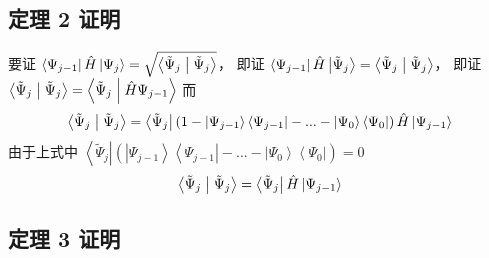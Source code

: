 \subsection{定理 2 证明}
要证 $\left\langle {{\Psi_{j - 1}}} \right|\hat H\left| {{\Psi_j}} \right\rangle  = \sqrt {\left\langle {{{{\tilde \Psi }_j}}}
 \mathrel{\left | {\vphantom {{{{\tilde \Psi }_j}} {{{\tilde \Psi }_j}}}}
 \right. \kern-\nulldelimiterspace}
 {{{{\tilde \Psi }_j}}} \right\rangle }$， 即证 $\left\langle {{\Psi_{j - 1}}} \right|\hat H\left| {{{\tilde \Psi }_j}} \right\rangle  = \left\langle {{{{\tilde \Psi }_j}}}
 \mathrel{\left | {\vphantom {{{{\tilde \Psi }_j}} {{{\tilde \Psi }_j}}}}
 \right. \kern-\nulldelimiterspace}
 {{{{\tilde \Psi }_j}}} \right\rangle$， 即证 $\left\langle {{{{\tilde \Psi }_j}}}
 \mathrel{\left | {\vphantom {{{{\tilde \Psi }_j}} {{{\tilde \Psi }_j}}}}
 \right. \kern-\nulldelimiterspace}
 {{{{\tilde \Psi }_j}}} \right\rangle  = \left\langle {{{{\tilde \Psi }_j}}}
 \mathrel{\left | {\vphantom {{{{\tilde \Psi }_j}} {\hat H{\Psi_{j - 1}}}}}
 \right. \kern-\nulldelimiterspace}
 {{\hat H{\Psi_{j - 1}}}} \right\rangle $
而
\begin{equation}
\left\langle {{\tilde \Psi }_j}
 \mathrel{\left | {\vphantom {{{\tilde \Psi }_j} {{\tilde \Psi }_j}}}
 \right. \kern-\nulldelimiterspace}
 {{\tilde \Psi }_j} \right\rangle  = \left\langle {{\tilde \Psi }_j} \right|\left( {1 - \left| {\Psi_{j - 1}} \right\rangle \left\langle {\Psi_{j - 1}} \right| - ... - \left| {\Psi_0} \right\rangle \left\langle {\Psi_0} \right|} \right)\hat H\left| {\Psi_{j - 1}} \right\rangle 
\end{equation}
由于上式中  $\left\langle {{{\tilde \Psi }_j}} \right|\left( {\left| {{\Psi_{j - 1}}} \right\rangle \left\langle {{\Psi_{j - 1}}} \right| - ... - \left| {{\Psi_0}} \right\rangle \left\langle {{\Psi_0}} \right|} \right) = 0$
\begin{equation}
 \left\langle {{\tilde \Psi }_j}
 \mathrel{\left | {\vphantom {{{\tilde \Psi }_j} {{\tilde \Psi }_j}}}
 \right. \kern-\nulldelimiterspace}
 {{\tilde \Psi }_j} \right\rangle  = \left\langle {{\tilde \Psi }_j} \right|\hat H\left| {\Psi_{j - 1}} \right\rangle
\end{equation}

\subsection{定理 3 证明}

